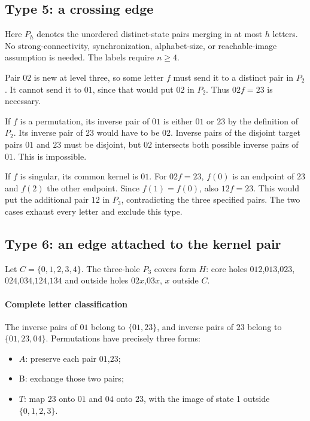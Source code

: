 \documentclass[11pt]{article}
\theoremstyle{definition}
\theoremstyle{plain}
\begin{document}
\subsection{Type 5: a crossing edge}\label{crossing-early-type-5-exclusion}

Here \(P_h\) denotes the unordered distinct-state pairs merging in at
most \(h\) letters. No strong-connectivity, synchronization,
alphabet-size, or reachable-image assumption is needed. The labels
require \(n\ge4\).

Pair \(02\) is new at
level three, so some letter \(f\) must send it to a distinct pair in
\(P_{2}\). It cannot send it to \(01\), since that would put \(02\) in
\(P_{2}\). Thus \(02\)\(f=23\) is necessary.

If \(f\) is a permutation, its inverse pair of \(01\) is either \(01\) or \(23\)
by the definition of \(P_{2}\). Its inverse pair of \(23\) would have to be
\(02\). Inverse pairs of the disjoint target pairs \(01\) and \(23\) must be
disjoint, but \(02\) intersects both possible inverse pairs of \(01\). This is
impossible.

If \(f\) is singular, its common kernel is \(01\). For \(02\)\(f=23\), \(f(0)\) is an
endpoint of \(23\) and \(f(2)\) the other endpoint. Since \(f(1)=f(0)\), also
\(12\)\(f=23\). This would put the additional pair \(12\) in \(P_{3}\),
contradicting the three specified pairs. The two cases exhaust every
letter and exclude this type.

\subsection{Type 6: an edge attached to the kernel pair}\label{kernel-tail-early-type-6-exclusion-at-codimension-three}

Let \(C=\{0,1,2,3,4\}\). The three-hole \(P_{3}\)
covers form \(H\): core holes \(012\),\(013\),\(023\),\(024\),\(034\),\(124\),\(134\) and outside
holes \(02x\),\(03x\), \(x\) outside \(C\).

\paragraph{Complete letter
classification}\label{complete-letter-classification}

The inverse pairs of \(01\) belong to \(\{01,23\}\), and inverse
pairs of \(23\) belong to \(\{01,23,04\}\). Permutations have precisely three
forms:

\begin{itemize}
\item
  \(A\): preserve each pair \(01\),\(23\);
\item
  B: exchange those two pairs;
\item
  \(T\): map \(23\) onto \(01\) and \(04\) onto \(23\), with the image of state 1
  outside \(\{0,1,2,3\}\).
\end{itemize}
\end{document}
